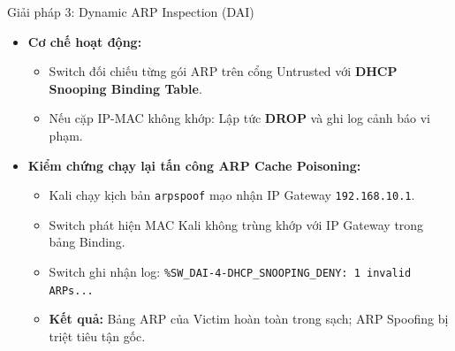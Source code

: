 \documentclass[fleqn]{beamer}
\begin{document}
\begin{frame}{Giải pháp 3: Dynamic ARP Inspection (DAI)}
  \begin{itemize}
    \item \textbf{Cơ chế hoạt động:}
      \begin{itemize}
        \item Switch đối chiếu từng gói ARP trên cổng Untrusted với \textbf{DHCP Snooping Binding Table}.
        \item Nếu cặp IP-MAC không khớp: Lập tức \textbf{DROP} và ghi log cảnh báo vi phạm.
      \end{itemize}
    \item \textbf{Kiểm chứng chạy lại tấn công ARP Cache Poisoning:}
      \begin{itemize}
        \item Kali chạy kịch bản \texttt{arpspoof} mạo nhận IP Gateway \texttt{192.168.10.1}.
        \item Switch phát hiện MAC Kali không trùng khớp với IP Gateway trong bảng Binding.
        \item Switch ghi nhận log: \texttt{\%SW\_DAI-4-DHCP\_SNOOPING\_DENY: 1 invalid ARPs...}
        \item \textbf{Kết quả:} Bảng ARP của Victim hoàn toàn trong sạch; ARP Spoofing bị triệt tiêu tận gốc.
      \end{itemize}
  \end{itemize}
\end{frame}
\end{document}
